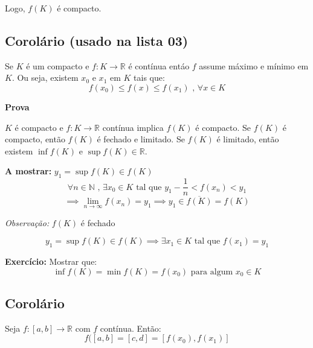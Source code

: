 \documentclass[12pt]{article}
\begin{document}
    Logo, $f(K)$ é compacto.

    \subsection*{Corolário (usado na lista 03)}
    Se $K$ é um compacto e $f: K \to \mathbb{R}$ é contínua entáo $f$ assume máximo e mínimo em $K$. Ou seja, existem $x_0$ e $x_1$ em $K$ tais que:
    \begin{equation*}
        f(x_0) \leq f(x) \leq f(x_1) \text{ , } \forall x \in K
    \end{equation*}

    \textbf{Prova}

    $K$ é compacto e $f: K \to \mathbb{R}$ contínua implica $f(K)$ é compacto. Se $f(K)$ é compacto, então $f(K)$ é fechado e limitado. Se $f(K)$ é limitado, então existem $\inf f(K)$ e  $\sup f(K) \in \mathbb{R}$. 

    \textbf{A mostrar: } $y_1 = \sup f(K) \in f(K)$
    \begin{equation*}
        \forall n \in \mathbb{N} \text{ , } \exists x_0 \in K \text{ tal que } y_1 - \frac{1}{n} < f(x_n) < y_1
    \end{equation*}
    \begin{equation*}
        \implies \lim \limits_{n \to \infty} f(x_n) = y_1 \implies y_1 \in \overline{f(K)} = f(K)
    \end{equation*}
    
    \textit{Observação: } $f(K)$ é fechado

    \begin{equation*}
        y_1 = \sup f(K) \in f(K) \implies \exists x_1 \in K \text{ tal que } f(x_1) = y_1
    \end{equation*}

    \textbf{Exercício: } Mostrar que:
    \begin{equation*}
        \inf f(K) = \min f(K) = f(x_0) \text{ para algum } x_0 \in K
    \end{equation*}

    \subsection*{Corolário}
    Seja $f: \left[a,b\right] \to \mathbb{R}$ com $f$ contínua. Então:
    \begin{equation*}
        f(\left[a, b\right] = \left[c, d\right] = \left[f(x_0), f(x_1)\right]
    \end{equation*}
\end{document}
